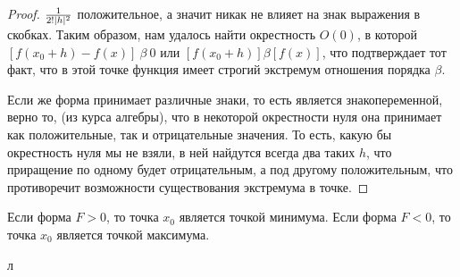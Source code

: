 \begin{proof}
${1 \over 2!|h|^2}$ положительное, а значит никак не влияет на знак выражения в скобках.
Таким образом, нам удалось найти окрестность $O(0)$, в которой $[f(x_0 + h) - f(x)]\ \beta\ 0$ или $[f(x_0 + h)] \beta [f(x)]$, что подтверждает тот факт, что в этой точке функция имеет строгий экстремум отношения порядка $\beta$.

Если же форма принимает различные знаки, то есть является знакопеременной, верно то, (из курса алгебры), что в некоторой окрестности нуля она принимает как положительные, так и отрицательные значения. То есть, какую бы окрестность нуля мы не взяли, в ней найдутся всегда два таких $h$, что приращение по одному будет отрицательным, а под другому положительным, что противоречит возможности существования экстремума в точке.
\end{proof}
\begin{consequence}
Если форма $F > 0$, то точка $x_0$ является точкой минимума. Если форма $F < 0$, то точка $x_0$ является точкой максимума.
\end{consequence}л
